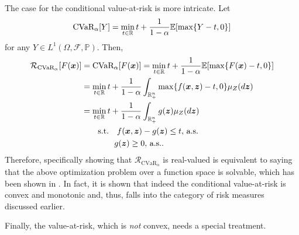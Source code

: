 \documentclass[12pt]{article}
\begin{document}
The case for the conditional value-at-risk is more intricate.
Let \[
    \text{CVaR}_\alpha[Y] = \min_{t\in \mathbb{R}} t + \frac{1}{1-\alpha} \mathbb{E}[\max\{Y-t,0\}]
\] for any $Y \in L^{1}(\Omega,\mathcal{F},\mathbb{P})$.
Then,
\begin{align*}
    \mathcal{R}_{\text{CVaR}_\alpha}[F(\bm{x})] &= \text{CVaR}_\alpha[F(\bm{x})] = \min_{t\in \mathbb{R}} t + \frac{1}{1-\alpha} \mathbb{E}[\max\{F(\bm{x})-t,0\}] \\
    &= \min_{t\in \mathbb{R}} t + \frac{1}{1-\alpha} \int_{\mathbb{R}^{n}_+} \max\{f(\bm{x},\bm{z})-t,0\} \mu_Z(d\bm{z}) \\
    &= \min_{t\in \mathbb{R}} t + \frac{1}{1-\alpha} \int_{\mathbb{R}^{n}_+} g(\bm{z}) \mu_Z(d\bm{z}) \\
    &\quad\quad \text{s.t.} \quad f(\bm{x},\bm{z}) - g(\bm{z}) \le t,\, \text{a.s.} \\
    &\quad\quad \quad \quad g(\bm{z}) \ge 0,\, \text{a.s.}
.\end{align*}
Therefore, specifically showing that $\mathcal{R}_{\text{CVaR}_\alpha}$ is real-valued is equivalent to saying that the above optimization problem over a function space is solvable, which has been shown in \citet[Chapter~6.2.4]{shapiroLecturesStochasticProgramming2009}.
In fact, it is shown that indeed the conditional value-at-risk is convex and monotonic and, thus, falls into the category of risk measures discussed earlier.

Finally, the value-at-risk, which is \emph{not} convex, needs a special treatment.






% 
\printbibliography
    
\end{document}
